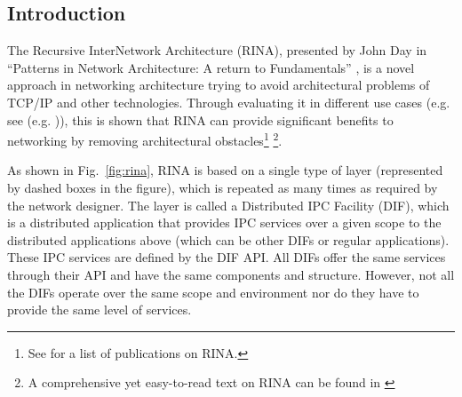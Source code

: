 \documentclass{ieeeaccess}
\begin{document}
\subsection{Introduction}
%
The Recursive InterNetwork Architecture (RINA), presented by John Day in ``Patterns in Network Architecture: A return to Fundamentals'' \cite{Day:2008:PNA}, is a novel approach in networking architecture trying to avoid architectural problems of TCP/IP and other technologies. Through evaluating it in different use cases (e.g. see (e.g. \cite{peymanICC16,boddapati2012assessing,day2008networking,7510780,leon2016benefits,small2012})), this is shown that RINA can provide significant benefits to networking by removing architectural obstacles\footnote{See \cite{pouzinsociety} for a list of publications on RINA.} \footnote{A comprehensive yet easy-to-read text on RINA can be found in \cite{NGP2019}}. 


As shown in Fig.~\ref{fig:rina}, RINA is based on a single type of layer (represented by dashed boxes in the figure), which is repeated as many times as required by the network designer. The layer is called a Distributed IPC Facility (DIF), which is a distributed application that provides IPC services over a given scope to the distributed applications above (which can be other DIFs or regular applications). These IPC services are defined by the DIF API. All DIFs offer the  same services through their API and have the same components and structure. However, not all the DIFs operate over the same scope and environment nor do they have to provide the same level of services. 
\end{document}
